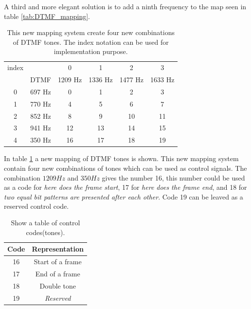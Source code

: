 	A third and more elegant solution is to add a ninth frequency to the map seen in table \ref{tab:DTMF_mapping}.
	
	\begin{table}[!h]
		\begin{center}
			\begin{tabular}{c c|c c c c}
	 		index & & 0 & 1 & 2 & 3 \\
			& DTMF & 1209 Hz & 1336 Hz & 1477 Hz & 1633 Hz \\
			\hline
			0 & 697 Hz & 0 & 1 & 2 & 3 \\
			1 & 770 Hz & 4 & 5 & 6 & 7 \\
			2 & 852 Hz & 8 & 9 & 10 & 11 \\
			3 & 941 Hz & 12 & 13 & 14 & 15 \\
			4 & 350 Hz & 16 & 17 & 18 & 19 \\
			\end{tabular}
		\end{center}
		\caption{This new mapping system create four new combinations of DTMF tones. The index notation can be used for
		implementation purpose.}
		\label{tab:newDTMF_mapping}
	\end{table}
	
	In table \ref{tab:newDTMF_mapping} a new mapping of DTMF tones is shown. This new mapping system contain four new combinations of tones
	which can be used as control signals. The combination $1209 Hz$ and $350 Hz$ gives the number 16, this number could be used as a code for
	\textit{here does the frame start}, 17 for \textit{here does the frame end}, and 18 for \textit{two equal bit patterns are presented after
	each other}. Code 19 can be leaved as a reserved control code. 
	
	\begin{table}[!h]
		\begin{center}
			\begin{tabular}{|c|c|}
			\hline
			\textbf{Code} & \textbf{Representation}\\
			\hline
			16 & Start of a frame \\
			\hline
			17 & End of a frame \\
			\hline
			18 & Double tone \\
			\hline
			19 & \textit{Reserved} \\
			\hline
			\end{tabular}
		\end{center}
		\caption{Show a table of control codes(tones).}
		\label{tab:physical_control_tones}
	\end{table}
	
